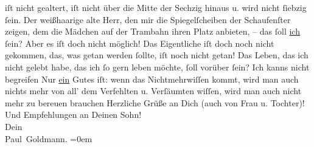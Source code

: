 \begin{ledgroupsized}[t]{13cm}
               iſt nicht gealtert, {\pb}iſt nicht über die Mitte
               der Sechzig hinaus u. wird nicht ſiebzig ſein. Der weißhaarige alte Herr, den mir die
               Spiegelſcheiben der Schaufenſter zeigen, dem die Mädchen auf der Trambahn ihren Platz
               anbieten, – das ſoll \uline{ich} ſein? Aber es iſt doch nicht
               möglich! Das Eigentliche iſt doch noch nicht gekommen, das, was getan werden ſollte,
               iſt noch nicht getan! Das Leben, das ich nicht gelebt habe, das ich ſo gern leben
               möchte, ſoll vorüber ſein? Ich kanns nicht begreifen{\dotsfive}\pend
           \pstart
           {\pb}Nur \uline{ein} Gutes
               iſt: wenn das \strikeout{\textcolor{gray}{gramſte}} Nichtmehrwiſſen kommt, wird man auch nichts mehr von all’ dem Verfehlten u.
               Verſäumten wiſſen, wird man auch nicht mehr zu bereuen brauchen{\dotsfive}\pend
           \pstart
           Herzliche Grüße an Dich (auch von Frau u. Tochter)! Und Empfehlungen an Deinen Sohn! {\\[\baselineskip]}Dein {\\[\baselineskip]}\spacefill\mbox{Paul Goldmann.}\pend
           \leftskip=0em{}
         
         \endnumbering{}\end{ledgroupsized}\begin{anhang}\end{anhang}\newcommand{\dateiname}{L03482}\newcommand{\titel}{Paul Goldmann an Arthur Schnitzler, 16. 8. 1930}\newcommand{\editorInnen}{Martin Anton Müller und Laura Untner}
      